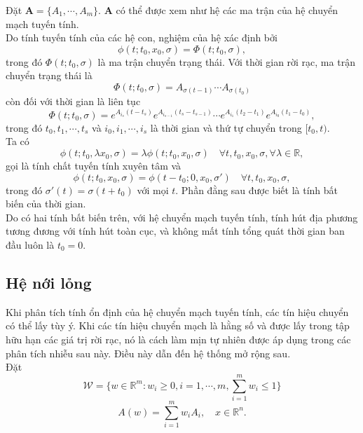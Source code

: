 \documentclass[14pt,a4paper,oneside]{report}		%
\begin{document}
Đặt $\mathbf{A} = \{A_1,\cdots,A_m\}$. $\mathbf{A}$ có thể được xem như hệ các ma trận của hệ chuyển mạch tuyến tính. \\
Do tính tuyến tính của các hệ con, nghiệm của hệ xác định bởi
\begin{equation} \label{eq2-17}
\phi (t;t_0,x_0,\sigma)=\Phi (t;t_0,\sigma),
\end{equation}
trong đó $\Phi (t;t_0,\sigma)$ là ma trận chuyển trạng thái. Với thời gian rời rạc, ma trận chuyển trạng thái là
$$\Phi (t;t_0,\sigma)=A_{\sigma (t-1)}\cdots A_{\sigma (t_0)}$$
còn đối với thời gian là liên tục
$$\Phi (t;t_0,\sigma )=e^{A_{i_s}(t-t_s)}e^{A_{i_{s-1}}(t_s-t_{s-1})}\cdots e^{A_{i_1}(t_2-t_1)}e^{A_{i_0}(t_1-t_0)},$$
trong đó $t_0,t_1,\cdots ,t_s$ và $i_0,i_1,\cdots,i_s$ 
là thời gian và thứ tự chuyển trong $[t_0,t)$.\\

Ta có
\begin{equation} \label{eq2-18}
\phi (t;t_0,\lambda x_0,\sigma) = \lambda \phi (t;t_0,x_0,\sigma)\quad \forall t,t_0,x_0,\sigma , \forall \lambda\in\mathbb{R},
\end{equation}
gọi là tính chất tuyến tính xuyên tâm và
\begin{equation} \label{eq2-19}
\phi (t;t_0,x_0,\sigma) = \phi (t-t_0;0,x_0,\sigma')\quad \forall t,t_0,x_0,\sigma,
\end{equation}
trong đó $\sigma'(t)=\sigma(t+t_0)$ với mọi $t$. Phần đằng sau được biết là tính bất biến của thời gian.\\

Do có hai tính bất biến trên, với hệ chuyển mạch tuyến tính, tính hút địa phương tương đương với tính hút toàn cục, và không mất tính tổng quát thời gian ban đầu luôn là $t_0 = 0$.

\subsection{Hệ nới lỏng}
Khi phân tích tính ổn định của hệ chuyển mạch tuyến tính, các tín hiệu chuyển có thể lấy tùy ý. Khi các tín hiệu chuyển mạch là hằng số và được lấy trong tập hữu hạn các giá trị rời rạc, nó là cách làm mịn tự nhiên được áp dụng trong các phân tích nhiễu sau này. Điều này dẫn đến hệ thống mở rộng sau.\\

Đặt
$$\mathcal{W} = \{ w\in\mathbb{R}^m:w_i \geq 0,  i=1,\cdots ,m,\sum_{i=1}^m w_i \leq 1 \}$$
\begin{equation} \label{2-20}
A(w) = \sum_{i=1}^m w_iA_i,\quad x\in\mathbb{R}^n.
\end{equation}
\end{document}
